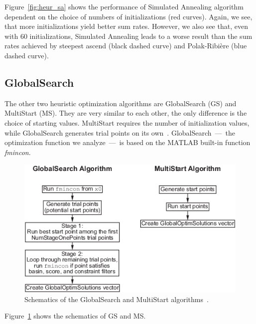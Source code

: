 Figure~\ref{fig:heur_sa} shows the performance of Simulated Annealing algorithm dependent on the choice of numbers of initializations (red curves).
Again, we see, that more initializations yield better sum rates.
However, we also see that, even with 60 initializations, Simulated Annealing leads to a worse result than the sum rates achieved by steepest ascend (black dashed curve) and Polak-Ribi\`{e}re (blue dashed curve).


\subsection{GlobalSearch}
\label{sec:globals}
The other two heuristic optimization algorithms are GlobalSearch (GS) and MultiStart (MS).
They are very similar to each other, the only difference is the choice of starting values.
MultiStart requires the number of initialization values, while GlobalSearch generates trial points on its own~\cite{matlab:gloabls}.
GlobalSearch~---~the optimization function we analyze~---~is based on the MATLAB built-in function \textit{fmincon}.
\begin{figure}[h]
\centering
  \includegraphics[width=0.8\linewidth]{images/global_algorithm.png}
\caption{Schematics of the GlobalSearch and MultiStart algorithms~\cite{matlab:gloabls}.}
\label{fig:globals_scheme}
\end{figure}
Figure~\ref{fig:globals_scheme} shows the schematics of GS and MS.


